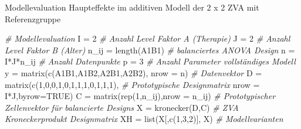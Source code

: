 \documentclass[
  8pt,
  ignorenonframetext,
]{beamer}
\newenvironment{Shaded}{\begin{snugshade}}{\end{snugshade}}
\newcommand{\AttributeTok}[1]{\textcolor[rgb]{0.77,0.63,0.00}{#1}}
\newcommand{\CommentTok}[1]{\textcolor[rgb]{0.56,0.35,0.01}{\textit{#1}}}
\newcommand{\ConstantTok}[1]{\textcolor[rgb]{0.00,0.00,0.00}{#1}}
\newcommand{\DecValTok}[1]{\textcolor[rgb]{0.00,0.00,0.81}{#1}}
\newcommand{\FunctionTok}[1]{\textcolor[rgb]{0.00,0.00,0.00}{#1}}
\newcommand{\NormalTok}[1]{#1}
\newcommand{\OtherTok}[1]{\textcolor[rgb]{0.56,0.35,0.01}{#1}}
\newcommand{\SpecialCharTok}[1]{\textcolor[rgb]{0.00,0.00,0.00}{#1}}
\begin{document}
\begin{frame}[fragile]{\small Modellevaluation \textbar{} Haupteffekte
im additiven Modell der 2 x 2 ZVA mit Referenzgruppe}
\protect\hypertarget{modellevaluation-haupteffekte-im-additiven-modell-der-2-x-2-zva-mit-referenzgruppe-3}{}
\vspace{3mm}
\tiny

\begin{Shaded}
\begin{Highlighting}[]
\CommentTok{\# Modellevaluation}
\NormalTok{I          }\OtherTok{=} \DecValTok{2}                                           \CommentTok{\# Anzahl Level Faktor A (Therapie)}
\NormalTok{J          }\OtherTok{=} \DecValTok{2}                                           \CommentTok{\# Anzahl Level Faktor B (Alter)}
\NormalTok{n\_ij       }\OtherTok{=} \FunctionTok{length}\NormalTok{(A1B1)                                }\CommentTok{\# balanciertes ANOVA Design}
\NormalTok{n          }\OtherTok{=}\NormalTok{ I}\SpecialCharTok{*}\NormalTok{J}\SpecialCharTok{*}\NormalTok{n\_ij                                    }\CommentTok{\# Anzahl Datenpunkte}
\NormalTok{p          }\OtherTok{=} \DecValTok{3}                                           \CommentTok{\# Anzahl Parameter vollständiges Modell}
\NormalTok{y          }\OtherTok{=} \FunctionTok{matrix}\NormalTok{(}\FunctionTok{c}\NormalTok{(A1B1,A1B2,A2B1,A2B2), }\AttributeTok{nrow =}\NormalTok{ n)    }\CommentTok{\# Datenvektor}
\NormalTok{D          }\OtherTok{=} \FunctionTok{matrix}\NormalTok{(}\FunctionTok{c}\NormalTok{(}\DecValTok{1}\NormalTok{,}\DecValTok{0}\NormalTok{,}\DecValTok{0}\NormalTok{,}\DecValTok{1}\NormalTok{,}\DecValTok{0}\NormalTok{,}\DecValTok{1}\NormalTok{,}\DecValTok{1}\NormalTok{,}\DecValTok{1}\NormalTok{,}\DecValTok{0}\NormalTok{,}\DecValTok{1}\NormalTok{,}\DecValTok{1}\NormalTok{,}\DecValTok{1}\NormalTok{),          }\CommentTok{\# Prototypische Designmatrix}
                     \AttributeTok{nrow =}\NormalTok{ I}\SpecialCharTok{*}\NormalTok{J,}\AttributeTok{byrow=}\ConstantTok{TRUE}\NormalTok{)}
\NormalTok{C          }\OtherTok{=} \FunctionTok{matrix}\NormalTok{(}\FunctionTok{rep}\NormalTok{(}\DecValTok{1}\NormalTok{,n\_ij),}\AttributeTok{nrow =}\NormalTok{ n\_ij)             }\CommentTok{\# Prototypischer Zellenvektor für balancierte Designs}
\NormalTok{X          }\OtherTok{=} \FunctionTok{kronecker}\NormalTok{(D,C)                              }\CommentTok{\# ZVA Kroneckerprodukt Designmatrix}
\NormalTok{XH         }\OtherTok{=} \FunctionTok{list}\NormalTok{(X[,}\FunctionTok{c}\NormalTok{(}\DecValTok{1}\NormalTok{,}\DecValTok{3}\NormalTok{,}\DecValTok{2}\NormalTok{)], X)                       }\CommentTok{\# Modellvarianten}

\end{Highlighting}
\end{Shaded}
\end{frame}
\end{document}
